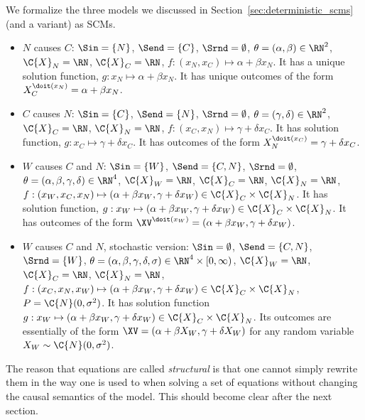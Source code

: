 \begin{Eg}\label{ex:scms_formal}
  We formalize the three models we discussed in Section~\ref{sec:deterministic_scms} (and a variant) as SCMs.
  \begin{itemize}
    \item $N$ causes $C$:
      $\Sin = \{N\}$, $\Send = \{C\}$, $\Srnd = \emptyset$, $\theta = (\alpha,\beta) \in \RN^2$, 
      $\C{X}_N = \RN$, $\C{X}_C = \RN$, $f : (x_N,x_C) \mapsto \alpha + \beta x_N$.
      It has a unique solution function, $g : x_N \mapsto \alpha + \beta x_N$.
      It has unique outcomes of the form $X_C^{\doit(x_N)} = \alpha + \beta x_N$.
    \item $C$ causes $N$:
      $\Sin = \{C\}$, $\Send = \{N\}$, $\Srnd = \emptyset$, $\theta = (\gamma,\delta) \in \RN^2$, 
      $\C{X}_C = \RN$, $\C{X}_N = \RN$, $f : (x_C,x_N) \mapsto \gamma + \delta x_C$.
      It has solution function, $g : x_C \mapsto \gamma + \delta x_C$.
      It has outcomes of the form $X_N^{\doit(x_C)} = \gamma + \delta x_C$.
    \item $W$ causes $C$ and $N$:
      $\Sin = \{W\}$, $\Send = \{C,N\}$, $\Srnd = \emptyset$, $\theta = (\alpha,\beta,\gamma,\delta) \in \RN^4$, 
      $\C{X}_W = \RN$, $\C{X}_C = \RN$, $\C{X}_N = \RN$, $f : (x_W,x_C,x_N) \mapsto (\alpha + \beta x_W, \gamma + \delta x_W) \in \C{X}_C \times \C{X}_N$.
      It has solution function, $g : x_W \mapsto (\alpha + \beta x_W, \gamma + \delta x_W) \in \C{X}_C \times \C{X}_N$.
      It has outcomes of the form $\XV^{\doit(x_W)} = (\alpha + \beta x_W, \gamma + \delta x_W)$.
    \item $W$ causes $C$ and $N$, stochastic version:
      $\Sin = \emptyset$, $\Send = \{C,N\}$, $\Srnd = \{W\}$, $\theta = (\alpha,\beta,\gamma,\delta,\sigma) \in \RN^4 \times [0,\infty)$, 
      $\C{X}_W = \RN$, $\C{X}_C = \RN$, $\C{X}_N = \RN$, $f : (x_C,x_N,x_W) \mapsto (\alpha + \beta x_W, \gamma + \delta x_W) \in \C{X}_C \times \C{X}_N$, $P = \C{N}(0,\sigma^2)$.
      It has solution function $g : x_W \mapsto (\alpha + \beta x_W, \gamma + \delta x_W) \in \C{X}_C \times \C{X}_N$.
      Its outcomes are essentially of the form $\XV = (\alpha + \beta X_W, \gamma + \delta X_W)$ for any random variable $X_W \sim \C{N}(0,\sigma^2)$.
  \end{itemize}
\end{Eg}

The reason that equations  are called \emph{structural} is that one cannot simply rewrite them 
in the way one is used to when solving a set of equations without changing the causal semantics of 
the model. This should become clear after the next section.


